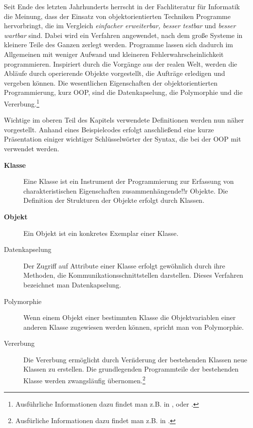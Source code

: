 Seit Ende des letzten Jahrhunderts herrscht in der Fachliteratur für Informatik
die Meinung, dass der Einsatz von objektorientierten Techniken Programme
hervorbringt, die im Vergleich \textit{einfacher erweiterbar, besser testbar}
und \textit{besser wartbar} sind. Dabei wird
ein Verfahren angewendet, nach dem große Systeme in kleinere Teile des Ganzen
zerlegt werden. Programme lassen sich dadurch im Allgemeinen mit weniger Aufwand
und kleineren Fehlerwahrscheinlichkeit programmieren. Inspiriert durch die
Vorgänge aus der realen Welt, werden die Abläufe durch operierende Objekte
vorgestellt, die Aufträge erledigen und vergeben können. Die wesentlichen
Eigenschaften der objektorientierten Programmierung, kurz
OOP, sind die Datenkapselung, die
Polymorphie und die Vererbung.\footnote{ Ausführliche Informationen dazu findet
man z.B.  in \cite{OOP},\cite{java} oder \cite{python}.}

Wichtige im oberen Teil des Kapitels verwendete Definitionen werden nun n\"aher
vorgestellt. Anhand eines
Beispielcodes erfolgt anschlie\ss end eine kurze Pr\"asentation einiger
wichtiger Schl\"usselw\"orter der Syntax, die bei der OOP mit \matlab verwendet
werden.

\begin{description}

	\item[\textbf{Klasse}] Eine Klasse ist ein Instrument der
	Programmierung zur Erfassung von charakteristischen Eigenschaften
	zusammenh\"angende!!r Objekte. Die Definition der Strukturen der Objekte
	erfolgt durch Klassen.

	\item[\textbf{Objekt}] Ein Objekt ist ein konkretes Exemplar einer
	Klasse.

	\item[Datenkapselung] Der Zugriff auf Attribute einer Klasse erfolgt
	gew\"ohnlich durch ihre Methoden, die Kommunikationsschnittstellen
	darstellen. Dieses Verfahren bezeichnet man Datenkapselung.

	\item[Polymorphie] Wenn einem Objekt einer bestimmten Klasse die
	Objektvariablen einer anderen Klasse zugewiesen werden k\"onnen, spricht
	man von Polymorphie.

	\item[Vererbung] Die Vererbung erm\"oglicht durch Ver\"nderung der
	bestehenden Klassen neue Klassen zu erstellen. Die grundlegenden
	Programmteile der bestehenden Klasse werden zwangsl\"aufig
	\"ubernomen.\footnote{ Ausf\"urliche Informationen dazu findet man z.B.
	in \cite{pepperOOP}.}

\end{description}


